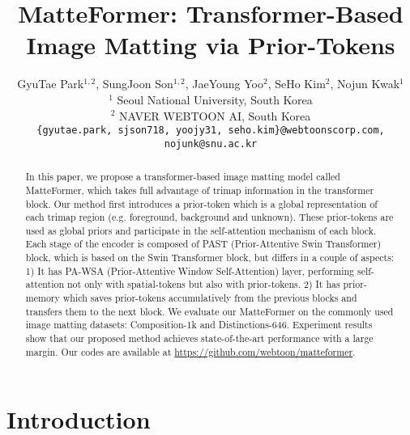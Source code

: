 \documentclass[10pt,twocolumn,letterpaper]{article}
\begin{document}
\title{MatteFormer: Transformer-Based Image Matting via Prior-Tokens}

\author{GyuTae Park$^{1,2}$, SungJoon Son$^{1,2}$, JaeYoung Yoo$^{2}$, SeHo Kim$^{2}$, Nojun Kwak$^{1}$\\
$^{1}$ Seoul National University, South Korea \\
$^{2}$ NAVER WEBTOON AI, South Korea\\
{\tt\small \{gyutae.park, sjson718, yoojy31, seho.kim\}@webtoonscorp.com, nojunk@snu.ac.kr}
}

\maketitle


\begin{abstract}
  In this paper, we propose a transformer-based image matting model called MatteFormer, which takes full advantage of trimap information in the transformer block. Our method first introduces a prior-token which is a global representation of each trimap region (e.g. foreground, background and unknown). These prior-tokens are used as global priors and participate in the self-attention mechanism of each block. Each stage of the encoder is composed of PAST (Prior-Attentive Swin Transformer) block, which is based on the Swin Transformer block, but differs in a couple of aspects:
  1) It has PA-WSA (Prior-Attentive Window Self-Attention) layer, performing self-attention not only with spatial-tokens but also with prior-tokens. 2) It has prior-memory which saves prior-tokens accumulatively from the previous blocks and transfers them to the next block.
  We evaluate our MatteFormer on the commonly used image matting datasets: Composition-1k and Distinctions-646. Experiment results show that our proposed method achieves state-of-the-art performance with a large margin. Our codes are available at \url{https://github.com/webtoon/matteformer}.
\end{abstract}

\section{Introduction}
\label{sec:intro}

{\let\thefootnote\relax{}
}
\end{document}
